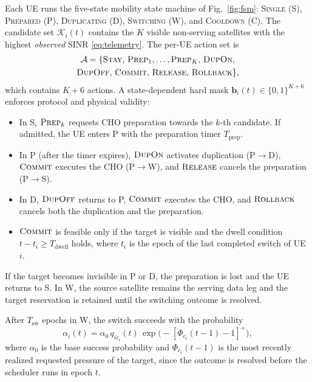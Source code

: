 \documentclass[journal]{IEEEtran}
\newcommand{\Aset}{\mathcal{A}}
\begin{document}
Each UE runs the five-state mobility state machine of Fig.~\ref{fig:fsm}:
\textsc{Single} (\textsf{S}), \textsc{Prepared} (\textsf{P}),
\textsc{Duplicating} (\textsf{D}), \textsc{Switching} (\textsf{W}), and
\textsc{Cooldown} (\textsf{C}). The candidate set $\mathcal{K}_i(t)$ contains
the $K$ visible non-serving satellites with the highest \emph{observed} SINR
\eqref{eq:telemetry}. The per-UE action set is
\begin{multline}
\Aset=\{\textsc{Stay},\,\textsc{Prep}_1,\dots,\textsc{Prep}_K,\,\textsc{DupOn},\\
\textsc{DupOff},\,\textsc{Commit},\,\textsc{Release},\,\textsc{Rollback}\},
\end{multline}
which contains $K+6$ actions. A state-dependent hard mask
$\mathbf{b}_i(t)\in\{0,1\}^{K+6}$ enforces protocol and physical validity:
\begin{itemize}
\item In \textsf{S}, $\textsc{Prep}_k$ requests CHO preparation towards the
$k$-th candidate. If admitted, the UE enters \textsf{P} with the preparation
timer $T_{\mathrm{prep}}$.
\item In \textsf{P} (after the timer expires), $\textsc{DupOn}$ activates
duplication (\textsf{P}$\to$\textsf{D}), $\textsc{Commit}$ executes the CHO
(\textsf{P}$\to$\textsf{W}), and $\textsc{Release}$ cancels the preparation
(\textsf{P}$\to$\textsf{S}).
\item In \textsf{D}, $\textsc{DupOff}$ returns to \textsf{P}, $\textsc{Commit}$
executes the CHO, and $\textsc{Rollback}$ cancels both the duplication and the
preparation.
\item $\textsc{Commit}$ is feasible only if the target is visible and the
dwell condition $t-t_i\ge T_{\mathrm{dwell}}$ holds, where $t_i$ is the epoch
of the last completed switch of UE $i$.
\end{itemize}
If the target becomes invisible in \textsf{P} or \textsf{D}, the
preparation is lost and the UE returns to \textsf{S}. In \textsf{W}, the
source satellite remains the serving data leg and the target reservation is
retained until the switching outcome is resolved.

After $T_{\mathrm{sw}}$ epochs in \textsf{W}, the switch succeeds with the
probability
\begin{equation}
\alpha_i(t)=\alpha_0\,q_{ic_i}(t)\,\exp\!\big(-[\Phi_{c_i}(t-1)-1]^+\big),
\label{eq:hosuccess}
\end{equation}
where $\alpha_0$ is the base success probability and $\Phi_{c_i}(t-1)$ is the
most recently realized requested pressure of the target, since the outcome is
resolved before the scheduler runs in epoch $t$.
\end{document}

